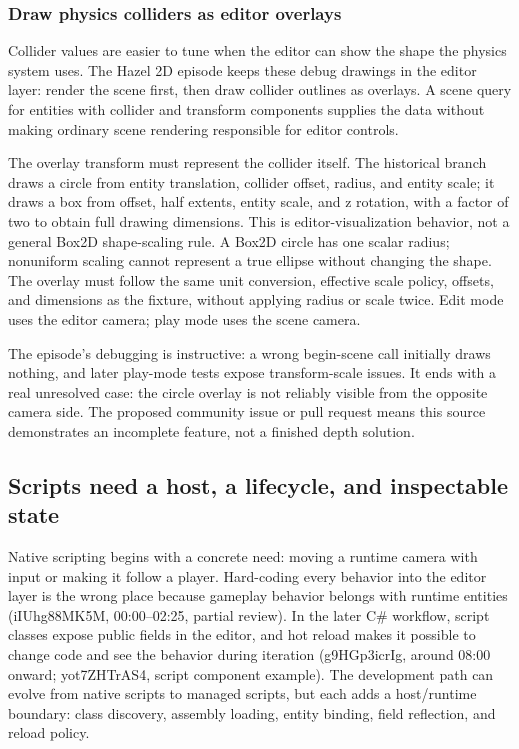 \subsubsection{Draw physics colliders as editor overlays}\label{06-engine-ii-ch033-draw-physics-colliders-as-editor-overlays}

\hypertarget{06-engine-ii-ch033-draw-physics-colliders-as-editor-overlays}{}

Collider values are easier to tune when the editor can show the shape the physics system uses. The Hazel 2D episode keeps these debug drawings in the editor layer: render the scene first, then draw collider outlines as overlays. A scene query for entities with collider and transform components supplies the data without making ordinary scene rendering responsible for editor controls.

The overlay transform must represent the collider itself. The historical branch draws a circle from entity translation, collider offset, radius, and entity scale; it draws a box from offset, half extents, entity scale, and z rotation, with a factor of two to obtain full drawing dimensions. This is editor-visualization behavior, not a general Box2D shape-scaling rule. A Box2D circle has one scalar radius; nonuniform scaling cannot represent a true ellipse without changing the shape. The overlay must follow the same unit conversion, effective scale policy, offsets, and dimensions as the fixture, without applying radius or scale twice. Edit mode uses the editor camera; play mode uses the scene camera.

The episode's debugging is instructive: a wrong begin-scene call initially draws nothing, and later play-mode tests expose transform-scale issues. It ends with a real unresolved case: the circle overlay is not reliably visible from the opposite camera side. The proposed community issue or pull request means this source demonstrates an incomplete feature, not a finished depth solution.

\subsection{Scripts need a host, a lifecycle, and inspectable state}\label{06-engine-ii-ch033-scripts-need-a-host-a-lifecycle-and-inspectable-state}

\hypertarget{06-engine-ii-ch033-scripts-need-a-host-a-lifecycle-and-inspectable-state}{}

Native scripting begins with a concrete need: moving a runtime camera with input or making it follow a player. Hard-coding every behavior into the editor layer is the wrong place because gameplay behavior belongs with runtime entities (iIUhg88MK5M, 00:00--02:25, partial review). In the later C\# workflow, script classes expose public fields in the editor, and hot reload makes it possible to change code and see the behavior during iteration (g9HGp3icrIg, around 08:00 onward; yot7ZHTrAS4, script component example). The development path can evolve from native scripts to managed scripts, but each adds a host/runtime boundary: class discovery, assembly loading, entity binding, field reflection, and reload policy.

